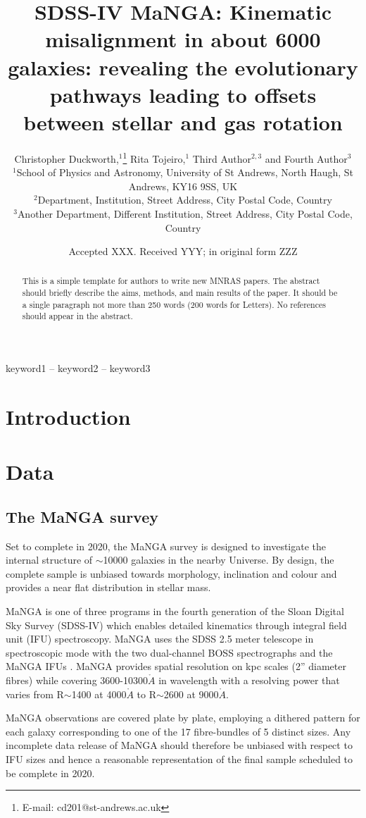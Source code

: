 \documentclass[fleqn,usenatbib]{mnras}
\title[Origin of kinematic misalignment]{SDSS-IV MaNGA: Kinematic misalignment in about 6000 galaxies: revealing the evolutionary pathways leading to offsets between stellar and gas rotation}
\author[C. Duckworth et al.]{Christopher Duckworth,$^{1}$\thanks{E-mail: cd201@st-andrews.ac.uk}
Rita Tojeiro,$^{1}$
Third Author$^{2,3}$
and Fourth Author$^{3}$
\\
{}$^{1}$School of Physics and Astronomy, University of St Andrews, North Haugh, St Andrews, KY16 9SS, UK\\
$^{2}$Department, Institution, Street Address, City Postal Code, Country\\
$^{3}$Another Department, Different Institution, Street Address, City Postal Code, Country
}
\date{Accepted XXX. Received YYY; in original form ZZZ}
\begin{document}
\label{firstpage}
\pagerange{\pageref{firstpage}--\pageref{lastpage}}
\maketitle

\begin{abstract}
This is a simple template for authors to write new MNRAS papers.
The abstract should briefly describe the aims, methods, and main results of the paper.
It should be a single paragraph not more than 250 words (200 words for Letters).
No references should appear in the abstract.
\end{abstract}

\begin{keywords}
keyword1 -- keyword2 -- keyword3
\end{keywords}
\section{Introduction}

\section{Data}
\subsection{The MaNGA survey}
Set to complete in 2020, the MaNGA survey is designed to investigate the internal structure of $\sim$10000 galaxies in the nearby Universe. By design, the complete sample is unbiased towards morphology, inclination and colour and provides a near flat distribution in stellar mass. 

MaNGA is one of three programs in the fourth generation of the Sloan Digital Sky Survey (SDSS-IV) which enables detailed kinematics through integral field unit (IFU) spectroscopy. MaNGA uses the SDSS 2.5 meter telescope in spectroscopic mode \citep{gunn2006} with the two dual-channel BOSS spectrographs \citep{smee2013} and the MaNGA IFUs \citep{drory2015}. MaNGA provides spatial resolution on kpc scales (2'' diameter fibres) while covering 3600-10300$\mathring{A}$ in wavelength with a resolving power that varies from R$\sim$1400 at 4000$\mathring{A}$ to R$\sim$2600 at 9000$\mathring{A}$. 

MaNGA observations are covered plate by plate, employing a dithered pattern for each galaxy corresponding to one of the 17 fibre-bundles of 5 distinct sizes. Any incomplete data release of MaNGA should therefore be unbiased with respect to IFU sizes and hence a reasonable representation of the final sample scheduled to be complete in 2020.
\end{document}
